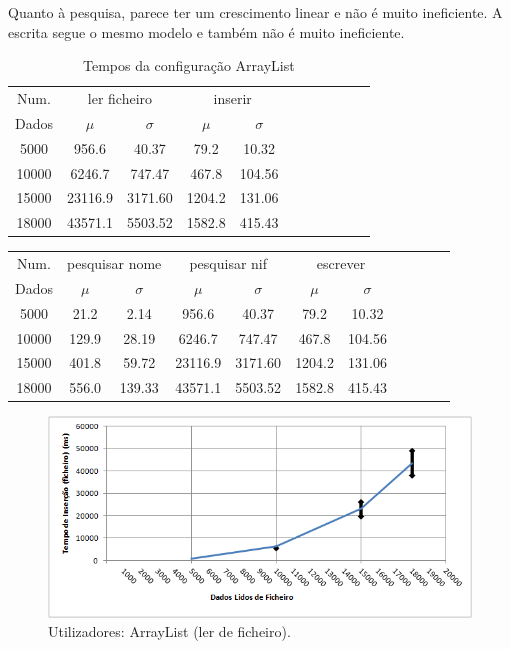 \documentclass[a5paper,twocolumn, 11pt]{article}
\begin{document}
Quanto à pesquisa, parece ter um crescimento linear e não é muito ineficiente. A escrita segue o mesmo modelo e também não é muito ineficiente.
\clearpage
\onecolumn
\begin{center}
    \begin{table}[h!b!t!]
    \begin{center}
    \caption{Tempos da configuração ArrayList}
    \begin{tabular}[hbt]{ | *{11}{c|} }
    \hline
        Num. & \multicolumn{2}{|c|}{ler ficheiro} & \multicolumn{2}{|c|}{inserir}\\ %
        Dados & $\mu$ & $\sigma$ & $\mu$ & $\sigma$\\ \hline
        5000 & 956.6 & 40.37 & 79.2 & 10.32\\ \hline
        10000 & 6246.7 & 747.47 & 467.8 & 104.56\\ \hline
        15000 & 23116.9 & 3171.60 & 1204.2 & 131.06\\ \hline
        18000 & 43571.1 & 5503.52 & 1582.8 & 415.43\\ \hline
    \end{tabular}
\end{center}
\end{table}
    \begin{tabular}{ | *{11}{c|} }
    \hline
        Num.  & \multicolumn{2}{|c|}{pesquisar nome} & \multicolumn{2}{|c|}{pesquisar nif} & \multicolumn{2}{|c|}{escrever}\\ %
        Dados & $\mu$ & $\sigma$ & $\mu$ & $\sigma$ & $\mu$ & $\sigma$\\ \hline
        5000 & 21.2 & 2.14 & 956.6 & 40.37 & 79.2 & 10.32\\ \hline
        10000 & 129.9 & 28.19 & 6246.7 & 747.47 & 467.8 & 104.56\\ \hline
        15000 & 401.8 & 59.72 & 23116.9 & 3171.60 & 1204.2 & 131.06\\ \hline
        18000 & 556.0 & 139.33 & 43571.1 & 5503.52 & 1582.8 & 415.43\\ \hline
    \end{tabular}
\end{center}
\begin{figure}[h!b!t!]
    \caption[Utilizadores: ArrayList (ler de ficheiro)]{Utilizadores: ArrayList (ler de ficheiro).}
    \label{hashtable}
    \centering
        \includegraphics[width=400pt]{user_c1_o1.png}
\end{figure}
\end{document}
